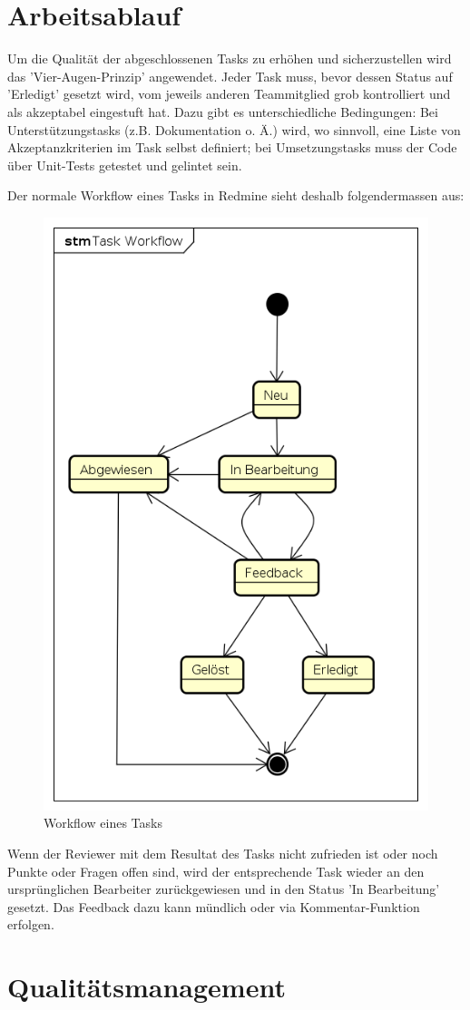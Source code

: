 \clearpage
\section{Arbeitsablauf}

Um die Qualität der abgeschlossenen Tasks zu erhöhen und sicherzustellen wird das 'Vier-Augen-Prinzip' angewendet. Jeder Task muss, bevor dessen Status auf 'Erledigt' gesetzt wird, vom jeweils anderen Teammitglied grob kontrolliert und als akzeptabel eingestuft hat. Dazu gibt es unterschiedliche Bedingungen: Bei Unterstützungstasks (z.B. Dokumentation o. Ä.) wird, wo sinnvoll, eine Liste von Akzeptanzkriterien im Task selbst definiert; bei Umsetzungstasks muss der Code über Unit-Tests getestet und gelintet sein.

Der normale Workflow eines Tasks in Redmine sieht deshalb folgendermassen aus:

\begin{figure}[H]
	\centering
	\includegraphics[width=0.5\linewidth]{fig/task_workflow}
	\caption{Workflow eines Tasks}
	\label{fig:pm:workflow}
\end{figure}

Wenn der Reviewer mit dem Resultat des Tasks nicht zufrieden ist oder noch Punkte oder Fragen offen sind, wird der entsprechende Task wieder an den ursprünglichen Bearbeiter zurückgewiesen und in den Status 'In Bearbeitung' gesetzt. Das Feedback dazu kann mündlich oder via Kommentar-Funktion erfolgen.

\section{Qualitätsmanagement}

